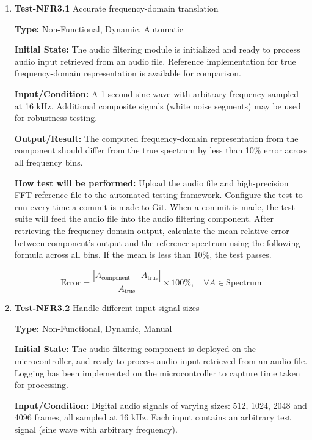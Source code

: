 \documentclass[12pt, titlepage]{article}
\begin{document}
\begin{enumerate}

\item{\textbf{Test-NFR3.1} Accurate frequency-domain translation\\}

\textbf{Type:} Non-Functional, Dynamic, Automatic
					
\textbf{Initial State:} 
The audio filtering module is initialized and ready to process audio input
retrieved from an audio file. Reference implementation for true frequency-domain
representation is available for comparison. 
					
\textbf{Input/Condition:} 
A 1-second sine wave with arbitrary frequency sampled at 16 kHz. Additional
composite signals (white noise segments) may be used for robustness testing. 
					
\textbf{Output/Result:} 
The computed frequency-domain representation from the component should differ
from the true spectrum by less than 10\% error across all frequency bins. 
					
\textbf{How test will be performed:} 
Upload the audio file and high-precision FFT reference file to the automated
testing framework. Configure the test to run every time a commit is made to Git.
When a commit is made, the test suite will feed the audio file into the audio
filtering component. After retrieving the frequency-domain output, calculate the
mean relative error between component's output and the reference spectrum using
the following formula across all bins. If the mean is less than 10\%, the test
passes. 

\[
\text{Error} = \frac{\left|A_{\text{component}} - A_{\text{true}}\right|}{A_{\text{true}}} \times 100\%, 
\quad \forall A \in \text{Spectrum}
\]
					
\item{\textbf{Test-NFR3.2} Handle different input signal sizes\\}

\textbf{Type:} Non-Functional, Dynamic, Manual
					
\textbf{Initial State:} 
The audio filtering component is deployed on the microcontroller, and ready to
process audio input retrieved from an audio file. Logging has been implemented
on the microcontroller to capture time taken for processing.
					
\textbf{Input/Condition:} 
Digital audio signals of varying sizes: 512, 1024, 2048 and 4096 frames, all
sampled at 16 kHz. Each input contains an arbitrary test signal (sine wave with
arbitrary frequency). 
					

\end{enumerate}
\end{document}
